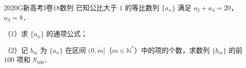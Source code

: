 
\begin{problem}{2020}{G}{新高考I卷}{18}{数列}
已知公比大于 $ 1 $ 的等比数列 $ \{a_n\} $ 满足 $ a_2+a_4=20 $，$ a_3=8 $．

（1）求 $ \{a_n\} $ 的通项公式；

（2）记 $ b_m $ 为 $ \{a_n\} $ 在区间 $ (0,m] $（$ m\in\mathbb{N}^* $）中的项的个数，求数列 $ \{b_m\} $ 的前 $ 100 $ 项和 $ S_{100} $．
\end{problem}

\begin{answer}

\end{answer}

\begin{solutions}

\end{solutions}